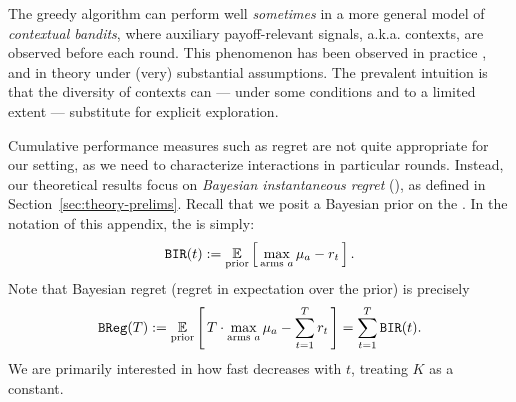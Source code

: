 The greedy algorithm can perform well \emph{sometimes} in a more general model of \emph{contextual bandits}, where auxiliary payoff-relevant signals, a.k.a. contexts, are observed before each round. This phenomenon has been observed in practice
\citep{practicalCB-arxiv18}, and in theory \citep{kannan2018smoothed,bastani2017exploiting,externalities-colt18} under (very) substantial assumptions. The prevalent intuition is that the diversity of contexts can --- under some conditions and to a limited extent --- substitute for explicit exploration.

Cumulative performance measures such as regret are not quite appropriate for our setting, as we need to characterize interactions in particular rounds. Instead, our theoretical results focus on \emph{Bayesian instantaneous regret} (\BIR), as defined in Section~\ref{sec:theory-prelims}. Recall that we posit a Bayesian prior on the \MRVs. In the notation of this appendix, the \BIR is simply:
\begin{align*}%
\BIR(t) := \E_{\text{prior}}\sbr{ \max_{\text{arms $a$}} \mu_a - r_t}.
\end{align*}
\noindent Note that Bayesian regret (\ie regret in expectation over the prior) is precisely
\begin{align}\label{eq:bg-BReg}
  \BReg(T):=
    \E_{\text{prior}}\sbr{ T\cdot \max_{\text{arms $a$}}\mu_a - \sum_{t=1}^T r_t }
    = \sum_{t=1}^T \BIR(t).
\end{align}
We are primarily interested in how fast \BIR decreases with $t$, treating $K$ as a constant.


